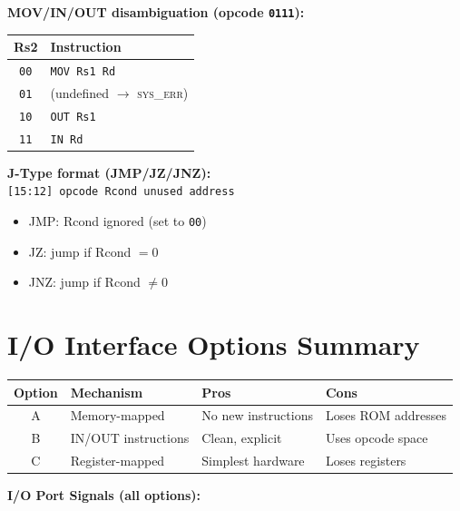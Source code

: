 \documentclass[11pt,a4paper]{article}
\newcommand{\signal}[1]{\textsc{#1}}
\begin{document}
\textbf{MOV/IN/OUT disambiguation (opcode \texttt{0111}):}

\begin{table}[H]
\centering
\begin{tabular}{@{}cl@{}}
\toprule
\textbf{Rs2} & \textbf{Instruction} \\
\midrule
\texttt{00} & \lstinline|MOV Rs1 Rd| \\
\texttt{01} & (undefined $\rightarrow$ \signal{sys\_err}) \\
\texttt{10} & \lstinline|OUT Rs1| \\
\texttt{11} & \lstinline|IN Rd| \\
\bottomrule
\end{tabular}
\end{table}

\textbf{J-Type format (JMP/JZ/JNZ):}\\
\texttt{[15:12] opcode \quad [11:10] Rcond \quad [9:4] unused \quad [3:0] address}
\begin{itemize}[nosep]
  \item JMP: Rcond ignored (set to \texttt{00})
  \item JZ: jump if Rcond $= 0$
  \item JNZ: jump if Rcond $\neq 0$
\end{itemize}

\section{I/O Interface Options Summary}

\begin{table}[H]
\centering
\begin{tabularx}{\textwidth}{@{}clXX@{}}
\toprule
\textbf{Option} & \textbf{Mechanism} & \textbf{Pros} & \textbf{Cons} \\
\midrule
A & Memory-mapped   & No new instructions          & Loses ROM addresses \\
B & IN/OUT instructions & Clean, explicit          & Uses opcode space \\
C & Register-mapped & Simplest hardware            & Loses registers \\
\bottomrule
\end{tabularx}
\end{table}


\textbf{I/O Port Signals (all options):}
\end{document}

